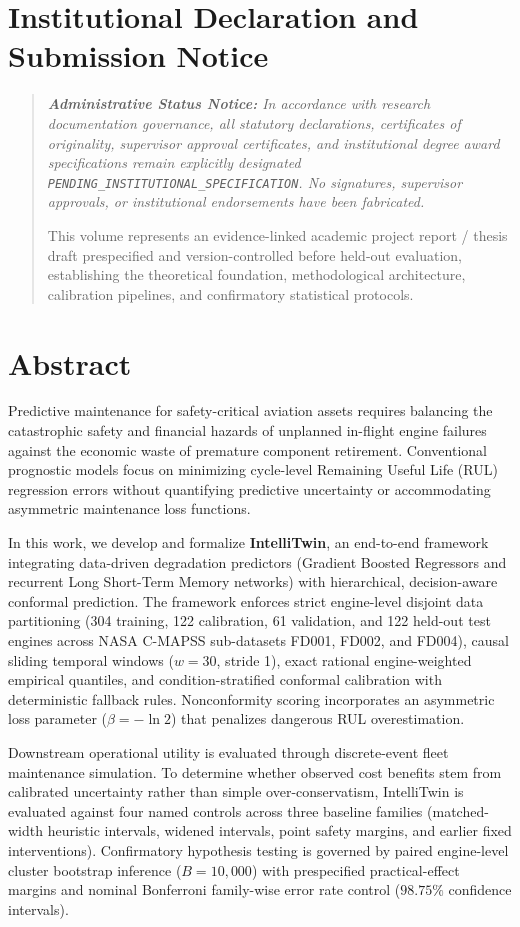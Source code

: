 \documentclass[12pt,a4paper,oneside]{report}
\begin{document}
\chapter*{Institutional Declaration and Submission Notice}
\begin{quote}
\itshape
\textbf{Administrative Status Notice:} In accordance with research documentation governance, all statutory declarations, certificates of originality, supervisor approval certificates, and institutional degree award specifications remain explicitly designated \texttt{PENDING\_INSTITUTIONAL\_SPECIFICATION}. No signatures, supervisor approvals, or institutional endorsements have been fabricated.

This volume represents an evidence-linked academic project report / thesis draft prespecified and version-controlled before held-out evaluation, establishing the theoretical foundation, methodological architecture, calibration pipelines, and confirmatory statistical protocols.
\end{quote}

\chapter*{Abstract}
Predictive maintenance for safety-critical aviation assets requires balancing the catastrophic safety and financial hazards of unplanned in-flight engine failures against the economic waste of premature component retirement. Conventional prognostic models focus on minimizing cycle-level Remaining Useful Life (RUL) regression errors without quantifying predictive uncertainty or accommodating asymmetric maintenance loss functions.

In this work, we develop and formalize \textbf{IntelliTwin}, an end-to-end framework integrating data-driven degradation predictors (Gradient Boosted Regressors and recurrent Long Short-Term Memory networks) with hierarchical, decision-aware conformal prediction. The framework enforces strict engine-level disjoint data partitioning (304 training, 122 calibration, 61 validation, and 122 held-out test engines across NASA C-MAPSS sub-datasets FD001, FD002, and FD004), causal sliding temporal windows ($w=30$, stride 1), exact rational engine-weighted empirical quantiles, and condition-stratified conformal calibration with deterministic fallback rules. Nonconformity scoring incorporates an asymmetric loss parameter ($\beta = -\ln 2$) that penalizes dangerous RUL overestimation.

Downstream operational utility is evaluated through discrete-event fleet maintenance simulation. To determine whether observed cost benefits stem from calibrated uncertainty rather than simple over-conservatism, IntelliTwin is evaluated against four named controls across three baseline families (matched-width heuristic intervals, widened intervals, point safety margins, and earlier fixed interventions). Confirmatory hypothesis testing is governed by paired engine-level cluster bootstrap inference ($B = 10{,}000$) with prespecified practical-effect margins and nominal Bonferroni family-wise error rate control ($98.75\%$ confidence intervals).
\end{document}
